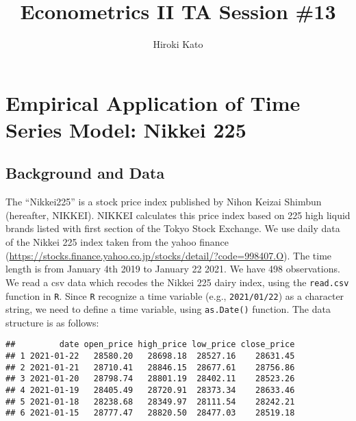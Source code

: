 \documentclass[
  12pt,
]{article}
\title{Econometrics II TA Session \#13}
\author{Hiroki Kato}
\date{}
\newenvironment{Shaded}{\begin{snugshade}}{\end{snugshade}}
\newcommand{\DataTypeTok}[1]{\textcolor[rgb]{0.13,0.29,0.53}{#1}}
\newcommand{\KeywordTok}[1]{\textcolor[rgb]{0.13,0.29,0.53}{\textbf{#1}}}
\newcommand{\NormalTok}[1]{#1}
\newcommand{\OperatorTok}[1]{\textcolor[rgb]{0.81,0.36,0.00}{\textbf{#1}}}
\newcommand{\OtherTok}[1]{\textcolor[rgb]{0.56,0.35,0.01}{#1}}
\newcommand{\StringTok}[1]{\textcolor[rgb]{0.31,0.60,0.02}{#1}}
\begin{document}
\maketitle

\hypertarget{empirical-application-of-time-series-model-nikkei-225}{%
\section{Empirical Application of Time Series Model: Nikkei
225}\label{empirical-application-of-time-series-model-nikkei-225}}

\hypertarget{background-and-data}{%
\subsection{Background and Data}\label{background-and-data}}

The ``Nikkei225'' is a stock price index published by Nihon Keizai
Shimbun (hereafter, NIKKEI). NIKKEI calculates this price index based on
225 high liquid brands listed with first section of the Tokyo Stock
Exchange. We use daily data of the Nikkei 225 index taken from the yahoo
finance
(\url{https://stocks.finance.yahoo.co.jp/stocks/detail/?code=998407.O}).
The time length is from January 4th 2019 to January 22 2021. We have 498
observations. We read a csv data which recodes the Nikkei 225 dairy
index, using the \texttt{read.csv} function in \texttt{R}. Since
\texttt{R} recognize a time variable (e.g., \texttt{2021/01/22}) as a
character string, we need to define a time variable, using
\texttt{as.Date()} function. The data structure is as follows:

\begin{Shaded}
\end{Shaded}

\begin{verbatim}
##         date open_price high_price low_price close_price
## 1 2021-01-22   28580.20   28698.18  28527.16    28631.45
## 2 2021-01-21   28710.41   28846.15  28677.61    28756.86
## 3 2021-01-20   28798.74   28801.19  28402.11    28523.26
## 4 2021-01-19   28405.49   28720.91  28373.34    28633.46
## 5 2021-01-18   28238.68   28349.97  28111.54    28242.21
## 6 2021-01-15   28777.47   28820.50  28477.03    28519.18
\end{verbatim}
\end{document}
